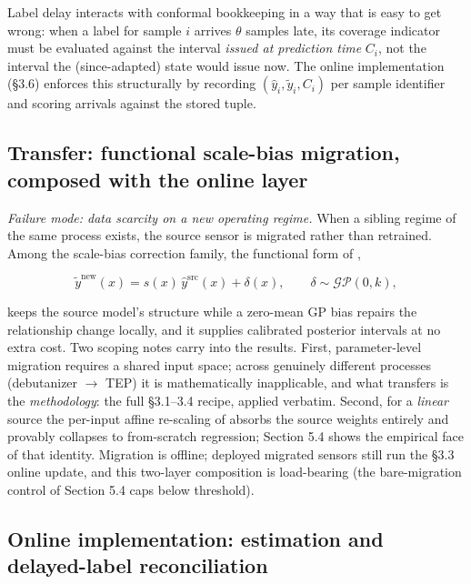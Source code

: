 Label delay interacts with conformal bookkeeping in a way that is easy to get wrong:
when a label for sample \(i\) arrives \(\theta\) samples late, its coverage indicator must
be evaluated against the interval \emph{issued at prediction time} \(C_i\), not the interval
the (since-adapted) state would issue now. The online implementation (\S 3.6) enforces this
structurally by recording \((\hat{y}_i, \tilde{y}_i, C_i)\) per sample identifier and
scoring arrivals against the stored tuple.

\subsection{Transfer: functional scale-bias migration, composed with the online layer}

\emph{Failure mode: data scarcity on a new operating regime.} When a sibling regime of the
same process exists, the source sensor is migrated rather than retrained. Among the
scale-bias correction family, the functional form of \citep{yan2011},

\[
\tilde{y}^{\mathrm{new}}(x) = s(x)\, \hat{y}^{\mathrm{src}}(x) + \delta(x),
\qquad \delta \sim \mathcal{GP}(0, k),
\]

keeps the source model's structure while a zero-mean GP bias repairs the relationship
change locally, and it supplies calibrated posterior intervals at no extra cost. Two
scoping notes carry into the results. First, parameter-level migration requires a
shared input space; across genuinely different processes (debutanizer $\to$ TEP) it is
mathematically inapplicable, and what transfers is the \emph{methodology}: the full
\S 3.1--3.4 recipe, applied verbatim. Second, for a \emph{linear} source the per-input affine
re-scaling of \citep{luo2015} absorbs the source weights entirely and provably
collapses to from-scratch regression; Section 5.4 shows the empirical face of that
identity. Migration is offline; deployed migrated sensors still run the \S 3.3 online
update, and this two-layer composition is load-bearing (the bare-migration control of
Section 5.4 caps below threshold).

\subsection{Online implementation: estimation and delayed-label reconciliation}

